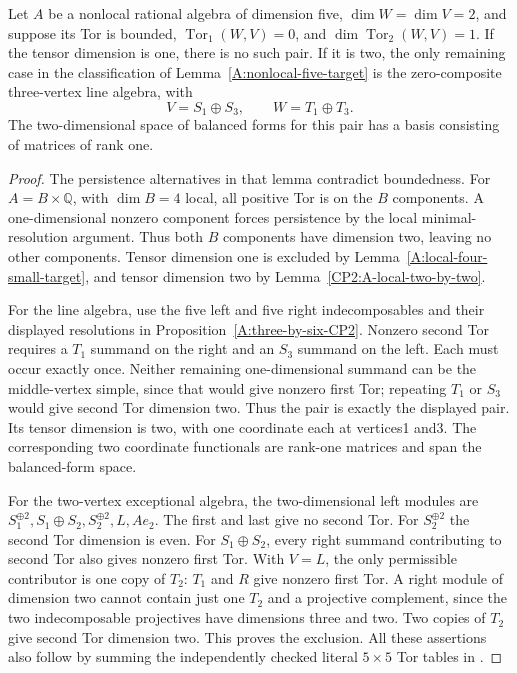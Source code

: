 \begin{lemma}
\label{CP2:A-five-algebra-two-by-two}
Let $A$ be a nonlocal rational algebra of dimension five,
$\dim W=\dim V=2$, and suppose its Tor is bounded,
$\operatorname{Tor}_1(W,V)=0$, and
$\dim\operatorname{Tor}_2(W,V)=1$.
If the tensor dimension is one, there is no such pair.
If it is two, the only remaining case in the classification
of Lemma~\ref{A:nonlocal-five-target} is the zero-composite
three-vertex line algebra, with
\[
 V=S_1\oplus S_3,\qquad W=T_1\oplus T_3.
\]
The two-dimensional space of balanced forms for this pair
has a basis consisting of matrices of rank one.
\end{lemma}
\begin{proof}
The persistence alternatives in that lemma contradict boundedness.
For $A=B\times\mathbb Q$, with $\dim B=4$ local, all positive
Tor is on the $B$ components. A one-dimensional nonzero
component forces persistence by the local minimal-resolution
argument. Thus both $B$ components have dimension two,
leaving no other components. Tensor dimension one is excluded
by Lemma~\ref{A:local-four-small-target}, and tensor dimension
two by Lemma~\ref{CP2:A-local-two-by-two}.

For the line algebra, use the five left and five right
indecomposables and their displayed resolutions in
Proposition~\ref{A:three-by-six-CP2}. Nonzero second Tor
requires a $T_1$ summand on the right and an $S_3$ summand
on the left. Each must occur exactly once. Neither remaining
one-dimensional summand can be the middle-vertex simple,
since that would give nonzero first Tor; repeating $T_1$
or $S_3$ would give second Tor dimension two. Thus the
pair is exactly the displayed pair. Its tensor dimension
is two, with one coordinate each at vertices1 and3.
The corresponding two coordinate functionals are rank-one
matrices and span the balanced-form space.

For the two-vertex exceptional algebra, the two-dimensional
left modules are
$S_1^{\oplus2},S_1\oplus S_2,S_2^{\oplus2},L,Ae_2$.
The first and last give no second Tor. For $S_2^{\oplus2}$
the second Tor dimension is even. For $S_1\oplus S_2$,
every right summand contributing to second Tor also gives
nonzero first Tor. With $V=L$, the only permissible
contributor is one copy of $T_2$: $T_1$ and $R$ give
nonzero first Tor. A right module of dimension two cannot
contain just one $T_2$ and a projective complement, since
the two indecomposable projectives have dimensions three
and two. Two copies of $T_2$ give second Tor dimension
two. This proves the exclusion. All these assertions also
follow by summing the independently checked literal
$5\times5$ Tor tables in
.
\end{proof}

